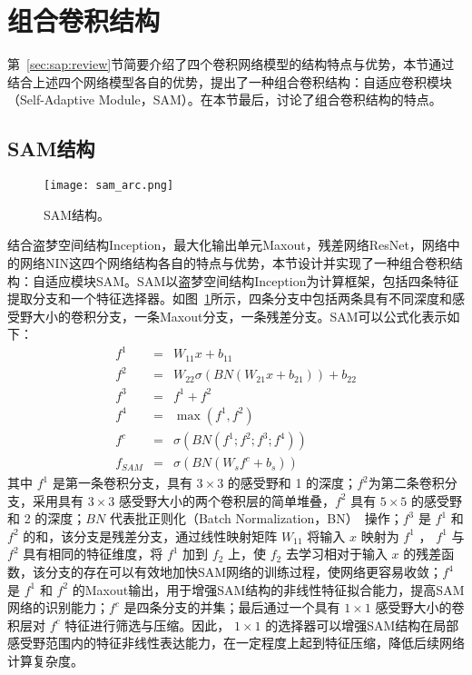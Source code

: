\section{组合卷积结构}
\label{sec:sap:model}

第~\ref{sec:sap:review}节简要介绍了四个卷积网络模型的结构特点与优势，本节通过结合上述四个网络模型各自的优势，提出了一种组合卷积结构：自适应卷积模块（Self-Adaptive Module，SAM）。在本节最后，讨论了组合卷积结构的特点。

\subsection{SAM结构}
\label{sec:sap:model:arc}

\begin{figure}[h]
\centering
\texttt{[image: sam\_arc.png]}
\caption{SAM结构。}
\label{fig:sam}
\end{figure}

结合盗梦空间结构Inception，最大化输出单元Maxout，残差网络ResNet，网络中的网络NIN这四个网络结构各自的特点与优势，本节设计并实现了一种组合卷积结构：自适应模块SAM。SAM以盗梦空间结构Inception为计算框架，包括四条特征提取分支和一个特征选择器。如图~\ref{fig:sam}所示，四条分支中包括两条具有不同深度和感受野大小的卷积分支，一条Maxout分支，一条残差分支。SAM可以公式化表示如下：
\begin{eqnarray} \label{equ:sam}
f^{1} &=& W_{11}x+b_{11} \nonumber\\
f^{2} &=& W_{22}\sigma(BN(W_{21}x+b_{21}))+b_{22} \nonumber\\
f^{3} &=& f^{1}+f^{2} \nonumber\\
f^{4} &=& \max(f^1, f^2) \nonumber\\
f^{c} &=& {\sigma}(BN(f^1; f^2; f^3; f^4)) \nonumber\\
f_{SAM} &=& {\sigma}(BN(W_{s}f^{c}+b_{s}))
\end{eqnarray}
其中 $f^{1}$ 是第一条卷积分支，具有 $3\times3$ 的感受野和 1 的深度；$f^{2}$为第二条卷积分支，采用具有 $3\times3$ 感受野大小的两个卷积层的简单堆叠，$f^{2}$ 具有 $5\times5$ 的感受野和 2 的深度；$BN$ 代表批正则化（Batch Normalization，BN）~\cite{ioffe2015batch}操作；$f^{3}$ 是 $f^{1}$ 和 $f^{2}$ 的和，该分支是残差分支，通过线性映射矩阵 $W_{11}$ 将输入 $x$ 映射为 $f^{1}$ ， $f^{1}$ 与 $f^{2}$ 具有相同的特征维度，将 $f^{1}$ 加到 $f_{2}$ 上，使 $f_{2}$ 去学习相对于输入 $x$ 的残差函数，该分支的存在可以有效地加快SAM网络的训练过程，使网络更容易收敛；$f^{4}$ 是 $f^{1}$ 和 $f^{2}$ 的Maxout输出，用于增强SAM结构的非线性特征拟合能力，提高SAM网络的识别能力；$f^{c}$ 是四条分支的并集；最后通过一个具有 $1\times1$ 感受野大小的卷积层对 $f^{c}$ 特征进行筛选与压缩。因此， $1\times1$ 的选择器可以增强SAM结构在局部感受野范围内的特征非线性表达能力，在一定程度上起到特征压缩，降低后续网络计算复杂度。


